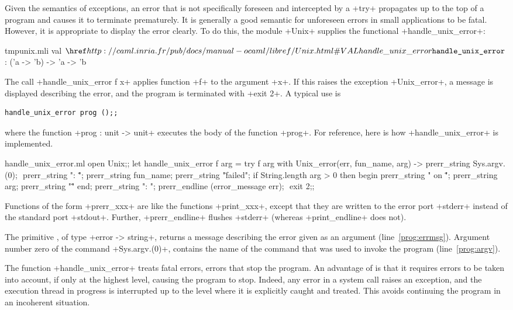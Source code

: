 Given the semantics of exceptions, an error that is not specifically
foreseen and intercepted by a \ml+try+ propagates up to the top of a
program and causes it to terminate prematurely.  It is generally a
good semantic for unforeseen errors in small applications to be
fatal. However, it is appropriate to display the error clearly. To do
this, the module \ml+Unix+ supplies the functional
\ml+handle_unix_error+:
%
\begin{listingcodefile}{tmpunix.mli}
val $\indexlibvalue{Unix}{handle\_unix\_error}$ : ('a -> 'b) -> 'a -> 'b
\end{listingcodefile}
%
The call  \ml+handle_unix_error f x+ applies function  \ml+f+ to the
argument \ml+x+. If this raises the exception \ml+Unix_error+, a
message is displayed describing the error, and the program is
terminated with  \ml+exit 2+. A typical use is
%
\begin{lstlisting}
handle_unix_error prog ();;
\end{lstlisting}
%
where the function  \ml+prog : unit -> unit+  executes the body of the
function  \ml+prog+. For reference, here is how
\ml+handle_unix_error+ is implemented.
%
\begin{listingcodefile}[style=numbers]{handle_unix_error.ml}
open Unix;;
let handle_unix_error f arg =
  try
    f arg
  with Unix_error(err, fun_name, arg) ->
    prerr_string Sys.argv.(0); $\label{prog:argv}$
    prerr_string ": \"";
    prerr_string fun_name;
    prerr_string "\" failed";
    if String.length arg > 0 then begin
      prerr_string " on \"";
      prerr_string arg;
      prerr_string "\""
    end;
    prerr_string ": ";
    prerr_endline (error_message err); $\label{prog:errmsg}$
    exit 2;;
\end{listingcodefile}
%
Functions of the form \ml+prerr_xxx+ are like the functions
\ml+print_xxx+, except that they are written to the error port
\ml+stderr+ instead of the standard port \ml+stdout+. Further,
\ml+prerr_endline+ flushes \ml+stderr+ (whereas \ml+print_endline+ does not).

The primitive , of type 
\ml+error -> string+, returns a message describing the error given as an argument
(line~\ref{prog:errmsg}). Argument number zero of the command
\ml+Sys.argv.(0)+, contains the name of the command that was used to
invoke the program (line~\ref{prog:argv}).

The function \ml+handle_unix_error+ treats fatal errors, \ie{} errors
that stop the program.  An advantage of {\ocaml} is that it requires
errors to be taken into account, if only at the highest level, causing
the program to stop. Indeed, any error in a system call raises an
exception, and the execution thread in progress is interrupted up to the
level where it is explicitly caught and treated. This avoids
continuing the program in an incoherent situation.

